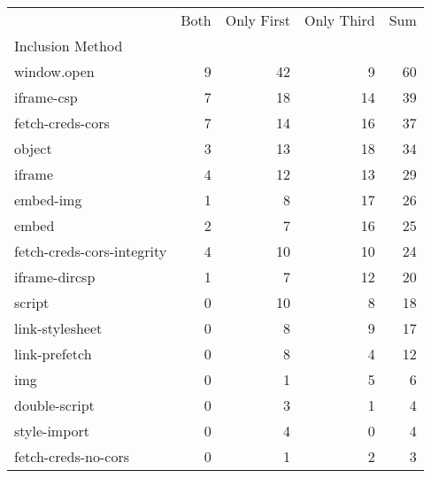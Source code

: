 \begin{tabular}{lrrrr}
 & Both & Only First & Only Third & Sum \\
Inclusion Method &  &  &  &  \\
window.open & 9 & 42 & 9 & 60 \\
iframe-csp & 7 & 18 & 14 & 39 \\
fetch-creds-cors & 7 & 14 & 16 & 37 \\
object & 3 & 13 & 18 & 34 \\
iframe & 4 & 12 & 13 & 29 \\
embed-img & 1 & 8 & 17 & 26 \\
embed & 2 & 7 & 16 & 25 \\
fetch-creds-cors-integrity & 4 & 10 & 10 & 24 \\
iframe-dircsp & 1 & 7 & 12 & 20 \\
script & 0 & 10 & 8 & 18 \\
link-stylesheet & 0 & 8 & 9 & 17 \\
link-prefetch & 0 & 8 & 4 & 12 \\
img & 0 & 1 & 5 & 6 \\
double-script & 0 & 3 & 1 & 4 \\
style-import & 0 & 4 & 0 & 4 \\
fetch-creds-no-cors & 0 & 1 & 2 & 3 \\
\end{tabular}
